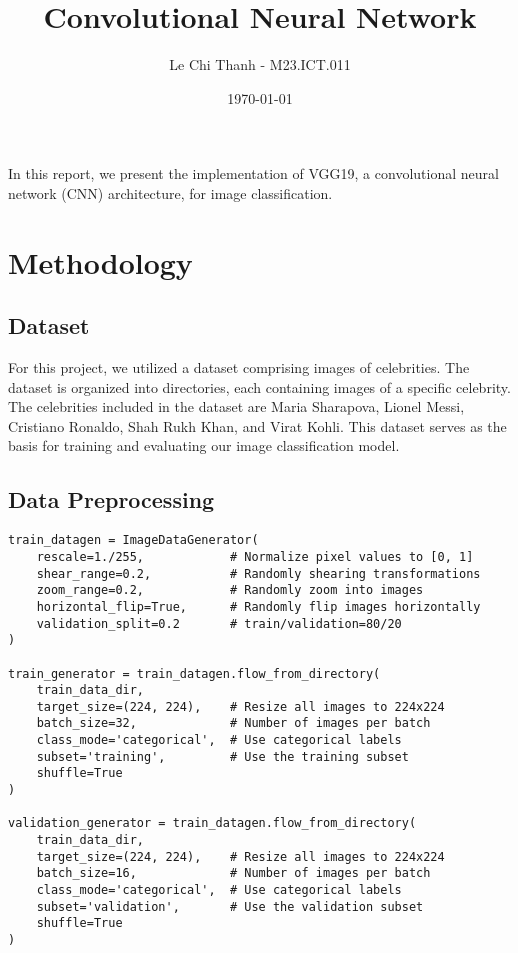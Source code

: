 \documentclass[12pt]{article}
\title{Convolutional Neural Network}
\author{Le Chi Thanh - M23.ICT.011}
\date{\today}
\begin{document}
\maketitle

In this report, we present the implementation of VGG19, a convolutional neural network (CNN) architecture, for image classification.

\section{Methodology}

\subsection{Dataset}

For this project, we utilized a dataset comprising images of celebrities. The dataset is organized into directories, each containing images of a specific celebrity. The celebrities included in the dataset are Maria Sharapova, Lionel Messi, Cristiano Ronaldo, Shah Rukh Khan, and Virat Kohli. This dataset serves as the basis for training and evaluating our image classification model.

\subsection{Data Preprocessing}

\begin{verbatim}
train_datagen = ImageDataGenerator(
    rescale=1./255,            # Normalize pixel values to [0, 1]
    shear_range=0.2,           # Randomly shearing transformations
    zoom_range=0.2,            # Randomly zoom into images
    horizontal_flip=True,      # Randomly flip images horizontally
    validation_split=0.2       # train/validation=80/20
)

train_generator = train_datagen.flow_from_directory(
    train_data_dir,
    target_size=(224, 224),    # Resize all images to 224x224
    batch_size=32,             # Number of images per batch
    class_mode='categorical',  # Use categorical labels
    subset='training',         # Use the training subset
    shuffle=True
)

validation_generator = train_datagen.flow_from_directory(
    train_data_dir,
    target_size=(224, 224),    # Resize all images to 224x224
    batch_size=16,             # Number of images per batch
    class_mode='categorical',  # Use categorical labels
    subset='validation',       # Use the validation subset
    shuffle=True
)
\end{verbatim}
\end{document}
